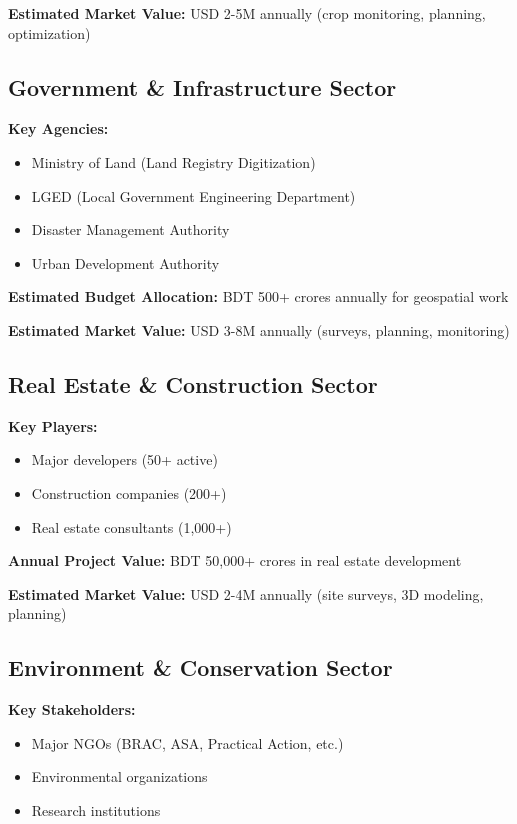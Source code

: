 \textbf{Estimated Market Value:} USD 2-5M annually (crop monitoring, planning, optimization)

\subsection{Government \& Infrastructure Sector}

\textbf{Key Agencies:}
\begin{itemize}
    \item Ministry of Land (Land Registry Digitization)
    \item LGED (Local Government Engineering Department)
    \item Disaster Management Authority
    \item Urban Development Authority
\end{itemize}

\textbf{Estimated Budget Allocation:} BDT 500+ crores annually for geospatial work

\textbf{Estimated Market Value:} USD 3-8M annually (surveys, planning, monitoring)

\subsection{Real Estate \& Construction Sector}

\textbf{Key Players:}
\begin{itemize}
    \item Major developers (50+ active)
    \item Construction companies (200+)
    \item Real estate consultants (1,000+)
\end{itemize}

\textbf{Annual Project Value:} BDT 50,000+ crores in real estate development

\textbf{Estimated Market Value:} USD 2-4M annually (site surveys, 3D modeling, planning)

\subsection{Environment \& Conservation Sector}

\textbf{Key Stakeholders:}
\begin{itemize}
    \item Major NGOs (BRAC, ASA, Practical Action, etc.)
    \item Environmental organizations
    \item Research institutions
\end{itemize}

